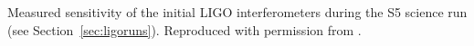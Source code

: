 \label{figure:LIGOsens}
Measured sensitivity of the initial LIGO interferometers
    during the S5 science run (see
    Section~\ref{sec:ligoruns}). Reproduced with permission from
    \cite{LIGOcurves}.